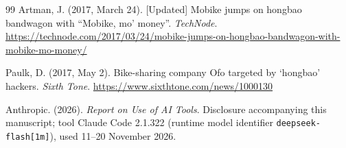 \begin{thebibliography}{99}
Artman, J. (2017, March 24). [Updated] Mobike jumps on hongbao bandwagon with
``Mobike, mo' money''. \emph{TechNode}.
\url{https://technode.com/2017/03/24/mobike-jumps-on-hongbao-bandwagon-with-mobike-mo-money/}

Paulk, D. (2017, May 2). Bike-sharing company Ofo targeted by `hongbao' hackers.
\emph{Sixth Tone}. \url{https://www.sixthtone.com/news/1000130}

Anthropic. (2026). \emph{Report on Use of AI Tools}. Disclosure accompanying this
manuscript; tool Claude Code 2.1.322 (runtime model identifier
\texttt{deepseek-flash[1m]}), used 11--20 November 2026.

\end{thebibliography}

